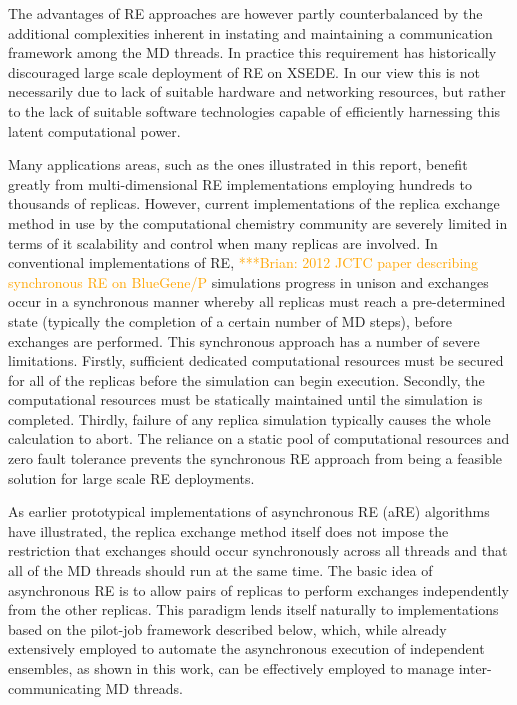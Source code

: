 \documentclass{sig-alternate}
\newcommand{\brnote}[1]{ {\textcolor{Orange} { ***Brian: #1 }}}
\newcommand{\brnote}[1]{ {}}
\begin{document}
The advantages of RE approaches are however partly counterbalanced by
the additional complexities inherent in instating and maintaining a
communication framework among the MD threads. In practice this
requirement has historically discouraged large scale deployment of RE
on XSEDE. In our view this is not necessarily due to lack of suitable
hardware and networking resources, but rather to the lack of suitable
software technologies capable of efficiently harnessing this latent
computational power.

Many applications areas, such as the ones illustrated in this report,
benefit greatly from multi-dimensional RE implementations employing
hundreds to thousands of replicas. However, current implementations
of the replica exchange method in use by the computational chemistry
community are severely limited in terms of it scalability and control
when many replicas are involved. In conventional implementations of
RE\cite{Jiang_JChemTheoryComput_2012_v8_p4672},\brnote{2012 JCTC paper describing synchronous RE on BlueGene/P} 
simulations progress in unison and exchanges occur in a
synchronous manner whereby all replicas must reach a pre-determined
state (typically the completion of a certain number of MD steps),
before exchanges are performed. This synchronous approach has a number
of severe limitations. Firstly, sufficient dedicated computational
resources must be secured for all of the replicas before the
simulation can begin execution. Secondly, the computational resources
must be statically maintained until the simulation is
completed. Thirdly, failure of any replica simulation typically causes
the whole calculation to abort. The reliance on a static pool of
computational resources and zero fault tolerance prevents the
synchronous RE approach from being a feasible solution for large scale
RE deployments.

As earlier prototypical implementations of asynchronous RE (aRE)
algorithms\cite{Gallicchio2008} have illustrated, the replica
exchange method itself does not impose the restriction that exchanges
should occur synchronously across all threads and that all of the MD
threads should run at the same time. The basic idea of asynchronous
RE is to allow pairs of replicas to perform exchanges independently
from the other replicas. This paradigm lends itself naturally to
implementations based on the pilot-job framework described below,
which, while already extensively employed to automate the asynchronous
execution of independent ensembles, as shown in this work, can be
effectively employed to manage inter-communicating MD threads.
\end{document}
